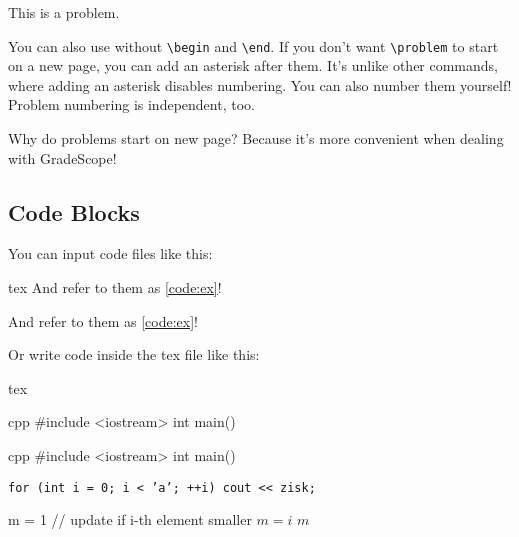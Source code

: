 \documentclass{fhw}
\begin{document}
\begin{problem}
  This is a problem.
\end{problem}
\problem You can also use without \verb|\begin| and \verb|\end|.
\problem* If you don't want \verb|\problem| to start on a new page, you can add an asterisk after them. It's unlike other commands, where adding an asterisk disables numbering.
\problem*[C8763 --- Starburst] You can also number them yourself!
\problem* Problem numbering is independent, too.

Why do problems start on new page? Because it's more convenient when dealing with GradeScope!

\subsection{Code Blocks}

You can input code files like this:

\begin{Code}{tex}
And refer to them as \cref{code:ex}!
\end{Code}

And refer to them as \cref{code:ex}!

Or write code inside the tex file like this:
\begin{Code}{tex}
\begin{Codee}{cpp}
#include <iostream>
int main() {}
\end{Codee} %
\end{Code}

\begin{Code}{cpp}
#include <iostream>
int main() {}
\end{Code}

\texttt{for (int i = 0; i < 'a'; ++i) cout << zisk; }

\begin{algorithm}
\begin{algorithmic}[1]
  \State m = 1
    \State // update if i-th element smaller
      \State $m = i$
    \EndIf
  \EndFor
  \State \Return $m$
  \EndProcedure
\end{algorithmic}
\end{algorithm}
\end{document}
